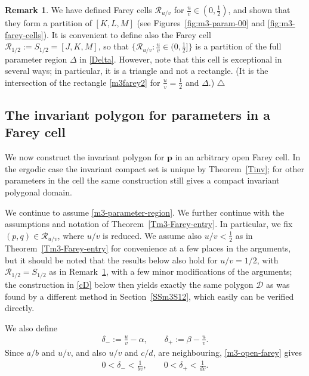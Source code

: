 \documentclass[11pt,reqno,tbtags,a4paper]{amsart}
\numberwithin{equation}{section}
\theoremstyle{plain}%
\theoremstyle{definition}
\newcommand\xqed[1]{%
    \leavevmode\unskip\penalty9999 \hbox{}\nobreak\hfill
    \quad\hbox{#1}}
\newtheorem{remarkqqq}[theorem]{Remark}
\newenvironment{remark}{\begin{remarkqqq}}
  {\xqed{$\triangle$}\end{remarkqqq}}
\theoremstyle{remark}
\newcommand{\refT}[1]{Theorem~\ref{#1}}
\newcommand{\refR}[1]{Remark~\ref{#1}}
\newcommand{\refSS}[1]{Section~\ref{#1}}
\newcommand\set[1]{\ensuremath{\{#1\}}}
\newcommand\cD{\mathcal D}
\newcommand\cR{{\mathcal R}}
\newcommand\vp{\mathbf{p}}
\newcommand\0{{\boldsymbol 0}}
\newcommand\1{{\boldsymbol 1}}
\begin{document}
\begin{remark}\label{R1/2}
  We have defined Farey cells $\cR_{u/v}$ for $\frac uv\in(0,\frac12)$, and
  shown that they form a partition of $[K,L,M]$ 
(see Figures~\ref{fig:m3-param-00} and \ref{fig:m3-farey-cells}).
It is convenient to define also the Farey cell
$\cR_{1/2}:=S_{1/2}=[J,K,M]$, so that $\set{\cR_{u/v}:\frac uv\in(0,\frac12]}$
is a partition of the full parameter region $\Delta$ in \eqref{Delta}. 
However, note that
this cell is exceptional in several ways; in particular, it is a triangle
and not a rectangle. (It is the intersection of the rectangle
\eqref{m3farey2} for $\frac uv=\frac12$ and $\Delta$.)
\end{remark}

\subsection{The invariant polygon for parameters in a Farey cell}
\label{SSm3construction}
We now construct the invariant polygon 
for $\vp$ in an arbitrary open Farey cell.  In
the ergodic case the invariant compact set is unique by \refT{Tinv}; for other
parameters in the cell the same construction still gives a compact invariant
polygonal domain.

We continue to assume \eqref{m3-parameter-region}.
We further continue with the assumptions and notation of \refT{Tm3-Farey-entry}.
In particular, we fix $(p,q)\in\cR_{u/v}$, where $u/v$ 
is reduced.
We assume also $u/v<\frac12$ as in \refT{Tm3-Farey-entry}
for convenience at a few places in the arguments,
but it should be noted
that the results below also hold for $u/v=1/2$, with $\cR_{1/2}=S_{1/2}$ as
in \refR{R1/2}, with a few minor modifications of the arguments;
the construction in \eqref{cD} below then yields exactly the same
polygon $\cD$ as was found by a different method in \refSS{SSm3S12},
which easily can be verified directly.
 
We also define
\begin{align}\label{m3-lambda-mu}
 \delta_-:=\frac uv-\alpha,\qquad \delta_+:=\beta-\frac uv.
\end{align}
Since $a/b$ and $u/v$, and also $u/v$ and $c/d$, are neighbouring,
\eqref{m3-open-farey} gives
\begin{align}\label{me-lambda-mu-b}
 0<\delta_-<\frac1{bv},\qquad 0<\delta_+<\frac1{dv}.
\end{align}
\end{document}
